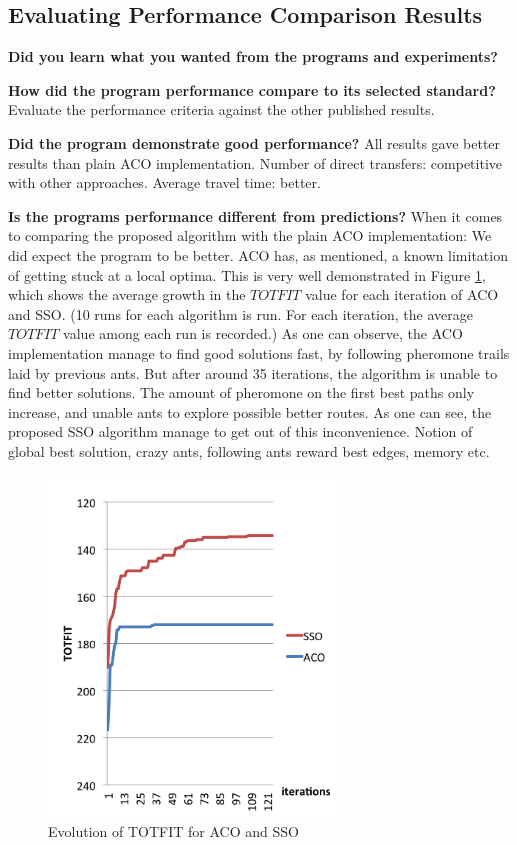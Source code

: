 \subsection{Evaluating Performance Comparison Results}

\textbf{Did you learn what you wanted from the programs and experiments?}

\textbf{How did the program performance compare to its selected standard?} 
Evaluate the performance criteria against the other published results. 

\textbf{Did the program demonstrate good performance?}
All results gave better results than plain ACO implementation.
Number of direct transfers: competitive with other approaches. Average travel time: better. 

\textbf{Is the programs performance different from predictions?} When it comes to comparing the proposed algorithm with the plain ACO implementation: We did expect the program to be better. ACO has, as mentioned, a known limitation of getting stuck at a local optima. This is very well demonstrated in Figure \ref{fig:acovssso}, which shows the average growth in the $TOTFIT$ value for each iteration of ACO and SSO. (10 runs for each algorithm is run. For each iteration, the average $TOTFIT$ value among each run is recorded.) As one can observe, the ACO implementation manage to find good solutions fast, by following pheromone trails laid by previous ants. But after around 35 iterations, the algorithm is unable to find better solutions. The amount of pheromone on the first best paths only increase, and unable ants to explore possible better routes. As one can see, the proposed SSO algorithm manage to get out of this inconvenience. Notion of global best solution, crazy ants, following ants reward best edges, memory etc.



 \begin{figure}[H]
    \begin{center}
    \includegraphics[width=3in]{assets/acovsssoNEW.png}
    \end{center}
    \caption{Evolution of TOTFIT for ACO and SSO }
    \label{fig:acovssso} 
\end{figure}

